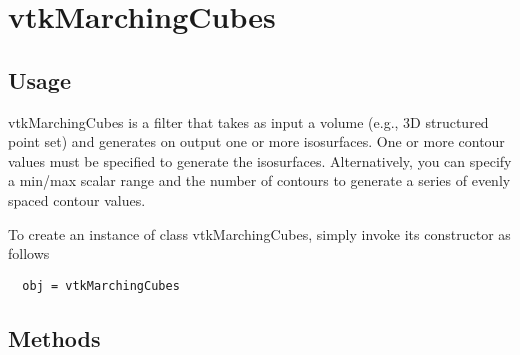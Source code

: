 \section{vtkMarchingCubes}

\subsection{Usage}

 vtkMarchingCubes is a filter that takes as input a volume (e.g., 3D
 structured point set) and generates on output one or more isosurfaces.
 One or more contour values must be specified to generate the isosurfaces.
 Alternatively, you can specify a min/max scalar range and the number of
 contours to generate a series of evenly spaced contour values.

To create an instance of class vtkMarchingCubes, simply
invoke its constructor as follows
\begin{verbatim}
  obj = vtkMarchingCubes
\end{verbatim}
\subsection{Methods}

